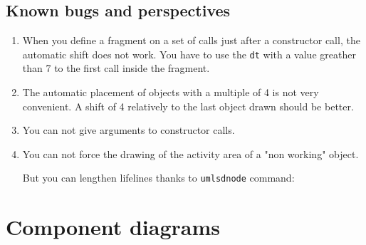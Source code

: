 \documentclass[a4paper,11pt]{report}
\begin{document}
\begin{center}
\end{center}

\section{Known bugs and perspectives}\label{s.seqbug}

\begin{enumerate}
	\item When you define a fragment on a set of calls just after a constructor call, the automatic shift does not work. You have to use the {\tt dt} with a value greather than 7 to the first call inside the fragment.
	\item The automatic placement of objects with a multiple of 4 is not very convenient. A shift of 4 relatively to the last object drawn should be better.
	\item You can not give arguments to constructor calls.
	\item You can not force the drawing of the activity area of a "non working" object.

	      \medskip

	      \begin{minipage}{0.3\textwidth}
		      
	      \end{minipage}
	      \begin{minipage}{0.7\textwidth}
		      \begin{center}
		      \end{center}
	      \end{minipage}

	      But you can lengthen lifelines thanks to {\tt umlsdnode} command:

	      \medskip

	      \begin{minipage}{0.3\textwidth}
		      
	      \end{minipage}
	      \begin{minipage}{0.7\textwidth}
		      \begin{center}
		      \end{center}
	      \end{minipage}

\end{enumerate}

\chapter{Component diagrams}
\end{document}
